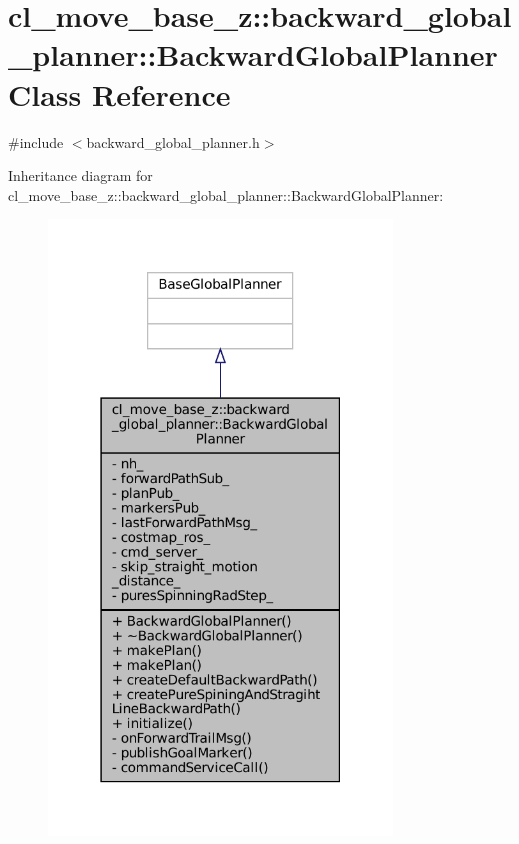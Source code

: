 \hypertarget{classcl__move__base__z_1_1backward__global__planner_1_1BackwardGlobalPlanner}{}\section{cl\+\_\+move\+\_\+base\+\_\+z\+:\+:backward\+\_\+global\+\_\+planner\+:\+:Backward\+Global\+Planner Class Reference}
\label{classcl__move__base__z_1_1backward__global__planner_1_1BackwardGlobalPlanner}


{\ttfamily \#include $<$backward\+\_\+global\+\_\+planner.\+h$>$}



Inheritance diagram for cl\+\_\+move\+\_\+base\+\_\+z\+:\+:backward\+\_\+global\+\_\+planner\+:\+:Backward\+Global\+Planner\+:
\nopagebreak
\begin{figure}[H]
\begin{center}
\leavevmode
\includegraphics[width=259pt]{classcl__move__base__z_1_1backward__global__planner_1_1BackwardGlobalPlanner__inherit__graph}
\end{center}
\end{figure}


